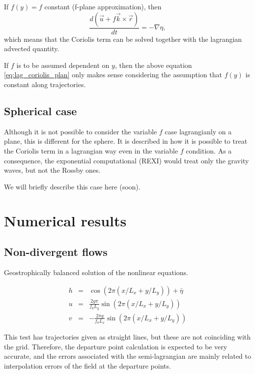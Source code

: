 \documentclass[10pt,a4paper]{article}
\begin{document}
If $f(y)=f$ constant (f-plane approximation), then
\begin{equation}
\frac{d\left( \vec{u} + f\vec{k}\times \vec{r}\right)}{dt}=-\nabla \eta, 
\label{eq:lag_coriolis_plan}
\end{equation}
which means that the Coriolis term can be solved together with the lagrangian advected quantity. 

If $f$ is to be assumed dependent on $y$, then the above equation \eqref{eq:lag_coriolis_plan} only makes sense considering the assumption that $f(y)$ is constant along trajectories. 

\subsection{Spherical case}

Although it is not possible to consider the variable $f$ case lagrangianly on a plane, this is different for the sphere. It is described in \cite{Temperton1997} how it is possible to treat the Coriolis term in a lagrangian way even in the variable $f$ condition. As a consequence, the exponential computational (REXI) would treat only the gravity waves, but not the Rossby ones.

We will briefly describe this case here (soon).

\section{Numerical results}


\subsection{Non-divergent flows}

Geostrophically balanced solution of the nonlinear equations.

\begin{eqnarray}
h&=&\cos\left( 2 \pi (x/L_x+y/L_y)\right)+ \bar{\eta}\\
u&=&\frac{2 g \pi}{f_0 L_y} \sin\left( 2 \pi (x/L_x+y/L_y)\right)\\
v&=&-\frac{2 \pi g}{f_0 L_x} \sin\left( 2 \pi (x/L_x+y/L_y)\right)
\end{eqnarray}

This test has trajectories given as straight lines, but these are not coinciding with the grid. Therefore, the departure point calculation is expected to be very accurate, and the errors associated with the semi-lagrangian are mainly related to interpolation errors of the field at the departure points. 
\end{document}
